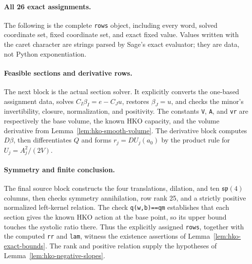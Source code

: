 \paragraph{All 26 exact assignments.}
The following is the complete \texttt{rows} object, including every word, solved
coordinate set, fixed coordinate set, and exact fixed value.  Values written
with the caret character are strings parsed by Sage's exact evaluator; they are data, not
Python exponentiation.



\paragraph{Feasible sections and derivative rows.}
The next block is the actual section solver.  It explicitly converts the
one-based assignment data, solves $C_I\beta_I=e-C_Ju$, restores $\beta_J=u$,
and checks the minor's invertibility, closure, normalization, and positivity.
The constants \texttt{V}, \texttt{A}, and \texttt{vr} are respectively the base
volume, the known HKO capacity, and the volume derivative from
Lemma~\ref{lem:hko-smooth-volume}. The derivative block computes $D\beta$,
then differentiates $Q$ and forms $r_j=DU_j(a_0)$ by the product rule for
$U_j=A_j^2/(2V)$.



\paragraph{Symmetry and finite conclusion.}
The final source block constructs the four translations, dilation, and ten
$\mathfrak{sp}(4)$ columns, then checks symmetry annihilation, row rank 25,
and a strictly positive normalized left-kernel relation. The check
\texttt{q(w,b)==qm} establishes that each section gives the known HKO action
at the base point, so its upper bound touches the systolic ratio there.
Thus the explicitly assigned \texttt{rows}, together with the computed
\texttt{rr} and \texttt{lam}, witness the existence assertions of
Lemma~\ref{lem:hko-exact-bounds}. The rank and positive relation supply the
hypotheses of Lemma~\ref{lem:hko-negative-slopes}.

